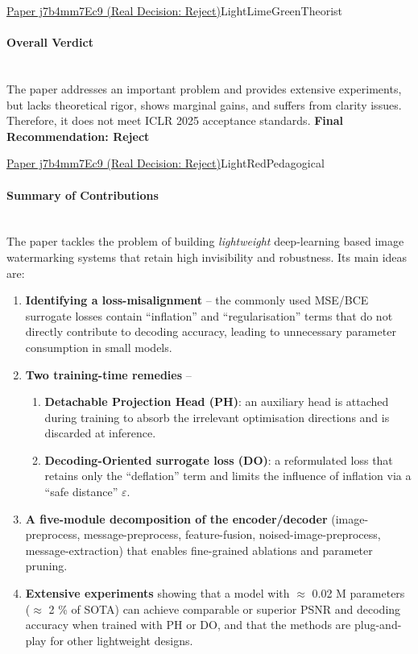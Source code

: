 \documentclass{article} %
\begin{document}
\begin{reviewbox}{\href{https://openreview.net/forum?id=j7b4mm7Ec9}{Paper j7b4mm7Ec9 (Real Decision: Reject)}}{LightLimeGreen}{Theorist}
\paragraph{Overall Verdict}
\leavevmode\\[0.1em]
The paper addresses an important problem and provides extensive experiments, but lacks theoretical rigor, shows marginal gains, and suffers from clarity issues. Therefore, it does not meet ICLR 2025 acceptance standards.
\textbf{Final Recommendation: Reject}
\end{reviewbox}

\begin{reviewbox}{\href{https://openreview.net/forum?id=j7b4mm7Ec9}{Paper j7b4mm7Ec9 (Real Decision: Reject)}}{LightRed}{Pedagogical}
\scriptsize
\paragraph{Summary of Contributions}\leavevmode\\[0.1em]
The paper tackles the problem of building \textit{lightweight} deep-learning based image watermarking systems that retain high invisibility and robustness. Its main ideas are:

\begin{enumerate}[leftmargin=0.5em, itemsep=0pt, topsep=0pt]
\item \textbf{Identifying a loss-misalignment} – the commonly used MSE/BCE surrogate losses contain “inflation” and “regularisation” terms that do not directly contribute to decoding accuracy, leading to unnecessary parameter consumption in small models.
\item \textbf{Two training-time remedies} –
\begin{enumerate}[leftmargin=0.5em, itemsep=0pt, topsep=0pt]
    \item \textbf{Detachable Projection Head (PH)}: an auxiliary head is attached during training to absorb the irrelevant optimisation directions and is discarded at inference.
    \item \textbf{Decoding-Oriented surrogate loss (DO)}: a reformulated loss that retains only the “deflation” term and limits the influence of inflation via a “safe distance” $\varepsilon$.
\end{enumerate}
\item \textbf{A five-module decomposition of the encoder/decoder} (image-preprocess, message-preprocess, feature-fusion, noised-image-preprocess, message-extraction) that enables fine-grained ablations and parameter pruning.
\item \textbf{Extensive experiments} showing that a model with $\approx$ 0.02 M parameters ($\approx$ 2 \% of SOTA) can achieve comparable or superior PSNR and decoding accuracy when trained with PH or DO, and that the methods are plug-and-play for other lightweight designs.
\end{enumerate}


\end{reviewbox}
\end{document}
